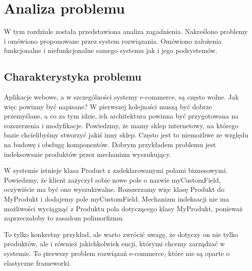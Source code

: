 \chapter{Analiza problemu}
\thispagestyle{chapterBeginStyle}
\label{rozdzial1}

W tym rozdziale została przedstawiona analiza zagadnienia. Nakreślono problemy i omówiono proponowane przez system rozwiązania. Omówiono założenia funkcjonalne i niefunkcjonalne samego systemu jak i jego podsystemów.


\section{Charakterystyka problemu}
Aplikacje webowe, a w szczególności systemy e-commerce, są często wolne. Jak więc powinny być napisane? W pierwszej kolejności muszą być dobrze przemyślane, a co za tym idzie, ich architektura powinna być przygotowana na rozszerzenia i modyfikacje. Powiedzmy, że mamy sklep internetowy, na którego bazie chcielibyśmy stworzyć jakiś inny sklep. Często jest to niemożliwe ze względu na budowę i obsługę komponentów. Dobrym przykładem problemu jest indeksowanie produktów przez mechanizm wyszukujący.
\begin{example}
	W systemie istnieje klasa Product z zadeklarowanymi polami biznesowymi. Powiedzmy, że klient zażyczył sobie nowe pole o nazwie myCustomField, oczywiście ma być ono wyszukiwalne. Rozszerzamy więc klasę Produkt do MyProdukt i dodajemy pole myCustomField. Mechanizm indeksacji nie ma możliwości wyciągnąć z Produktu pola dotyczącego klasy MyProdukt, ponieważ zaprzeczałoby to zasadom polimorfizmu.
\end{example} 
To tylko konkretny przykład, ale warto zwrócić uwagę, że dotyczy on nie tylko produktów, ale i również jakichkolwiek encji, którymi chcemy zarządzać w systemie. To pierwszy problem rozwiązań e-commerce, które nie są oparte o elastyczne frameworki. 

